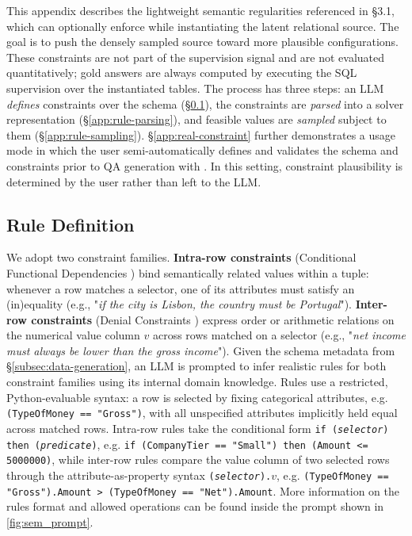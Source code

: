 This appendix describes the lightweight semantic regularities referenced
in \S3.1, which \name{} can optionally enforce while instantiating the latent relational source. The goal is to push the densely sampled source toward more plausible configurations. These constraints are not part of the supervision signal and are not evaluated quantitatively; gold answers are always computed by executing the SQL supervision over the instantiated tables. The process has three steps: an LLM \emph{defines} constraints over the schema (\S\ref{app:rule-definition}), the constraints are \emph{parsed} into a solver representation (\S\ref{app:rule-parsing}), and feasible values are \emph{sampled} subject to them (\S\ref{app:rule-sampling}). 
\S\ref{app:real-constraint} further demonstrates a usage mode in which the user semi-automatically defines and validates the schema and constraints prior to QA generation with \name{}. In this setting, constraint plausibility is determined by the user rather than left to the LLM.

\subsection{Rule Definition}
\label{app:rule-definition}

We adopt two constraint families. \textbf{Intra-row constraints} (Conditional Functional Dependencies \citealp{cfd}) bind semantically related values within a tuple: whenever a row matches a
selector, one of its attributes must satisfy an (in)equality (e.g., "\emph{if the city is Lisbon, the country must be Portugal}").
\textbf{Inter-row constraints} (Denial Constraints \citealp{dc}) express order or
arithmetic relations on the numerical value column $v$ across rows matched on a selector (e.g., "\emph{net income must always be lower than the gross income}"). Given the schema metadata from \S\ref{subsec:data-generation}, an LLM is prompted to infer realistic rules for both constraint families using its internal domain knowledge. Rules use a restricted, Python-evaluable syntax: a row is selected by fixing categorical attributes, e.g. \texttt{(TypeOfMoney == "Gross")}, with all unspecified attributes implicitly held equal across matched rows. 
Intra-row rules take the conditional form \texttt{if (\textit{selector}) then (\textit{predicate})}, e.g. \texttt{if (CompanyTier == "Small") then (Amount <= 5000000)}, while inter-row rules compare the value column of two selected rows through the
attribute-as-property syntax \texttt{(\textit{selector}).$v$}, e.g.
\texttt{(TypeOfMoney == "Gross").Amount > (TypeOfMoney == "Net").Amount}. More information on the rules format and allowed operations can be found inside the prompt shown in \autoref{fig:sem_prompt}.

